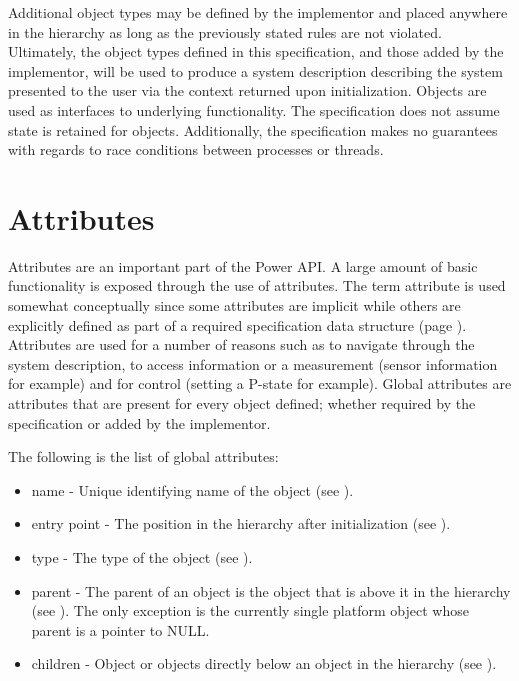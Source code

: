 Additional object types may be defined by the implementor and placed anywhere in the hierarchy as long as the previously stated rules are not violated.
Ultimately, the  object types defined in this specification, and those added by the implementor, will be used to produce a system description describing the system presented to the user via the context returned upon initialization.
Objects are used as interfaces to underlying functionality.
The specification does not assume state is retained for objects.
Additionally, the specification makes no guarantees with regards to race conditions between processes or threads.

\section{Attributes}\label{sec:TheoryAttributes}
Attributes are an important part of the Power API.
A large amount of basic functionality is exposed through the use of attributes.
The term attribute is used somewhat conceptually since some attributes are implicit while others are explicitly defined as part of a required specification data structure (page \pageref{type:AttrName}).
Attributes are used for a number of reasons such as to navigate through the system description, to access information or a measurement (sensor information for example) and for control (setting a P-state for example).
Global attributes are attributes that are present for every object defined; whether required by the specification or added by the implementor. 

The following is the list of global attributes:
\begin{itemize}[noitemsep,nolistsep] %
\item{name} - Unique identifying name of the object (see ).
\item{entry point} - The position in the hierarchy after initialization (see ).
\item{type} - The type of the object (see ).
\item{parent} - The parent of an object is the object that is above it in the hierarchy (see ).  The only exception is the currently single platform object whose parent is a pointer to NULL. 
\item{children} -  Object or objects directly below an object in the hierarchy (see ).
\end{itemize}

